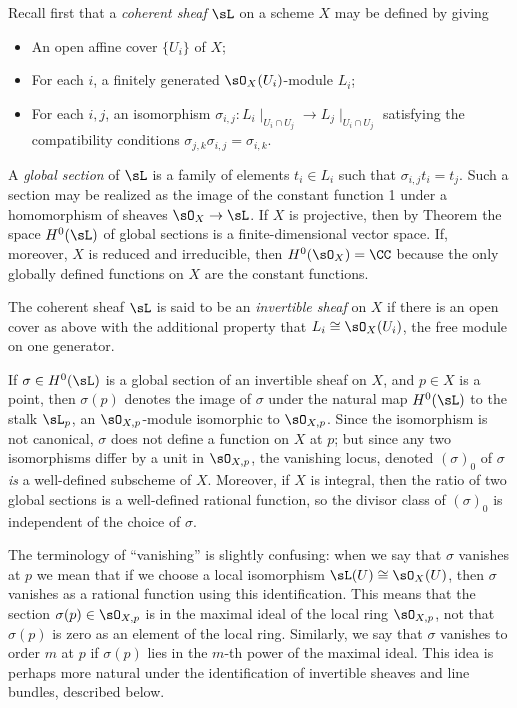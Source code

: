 Recall first that a \emph{coherent sheaf} $\sL$ on a scheme $X$ may be defined by
giving 
\begin{itemize}
 \item An open affine cover $\{U_{i}\}$ of $X$; 
 \item For each $i$, a finitely generated $\sO_{X}(U_{i})$-module $L_{i}$;
 \item For each $i,j$, an isomorphism $\sigma_{i,j}: L_{i}\mid_{U_{i}\cap U_{j}} \to L_{j}\mid_{U_{i}\cap U_{j}}$
 satisfying the compatibility conditions $\sigma_{j,k}\sigma_{i,j} = \sigma_{i,k}$. 
 \end{itemize}

A \emph{global section} of $\sL$ is a family of elements $t_{i}\in L_{i}$ such that 
$\sigma_{i,j} t_{i} = t_{j}$. Such a section may be realized as the image of the constant function 1 under
a homomorphism of sheaves $\sO_{X} \to \sL$. If $X$ is projective, then 
by Theorem \cite[Thm III.5.2]{H} the space $H^{0}(\sL)$  of global sections is
a finite-dimensional vector space. If, moreover, $X$ is reduced and irreducible, then $H^{0}(\sO_{X}) = \CC$ because the only globally defined
functions on $X$ are the constant functions.

The coherent sheaf $\sL$ is said to be an \emph{invertible sheaf} on $X$ if there is an open cover as above with the additional property
that $L_{i} \cong \sO_X(U_{i})$, the free module on one generator. 

If $\sigma \in H^0(\sL)$ is a global section of an invertible sheaf
on $X$, and $p\in X$ is a point, then $\sigma(p)$ denotes the image of $\sigma$ under the natural map $H^0(\sL)$ to the stalk $\sL_{p}$, an $\sO_{X,p}$-module isomorphic to $\sO_{X,p}$. Since the isomorphism is not canonical, $\sigma$ does not define a function on $X$ at $p$; but since any two isomorphisms
differ by a unit in $\sO_{X,p}$, the vanishing locus, denoted $(\sigma)_0$ of $\sigma$ \emph{is} a well-defined subscheme of $X$. Moreover, if $X$ is integral, then the ratio of two global sections is a well-defined rational function, so the divisor class of 
$(\sigma)_0$ is independent of the choice of $\sigma$.

The terminology of ``vanishing'' is slightly confusing: when we  say that $\sigma$ vanishes at $p$ we mean
that if we choose a local isomorphism $\sL(U) \cong \sO_X(U)$, then $\sigma$ vanishes as a rational function using this
identification. This means that the section $\sigma(p)\in \sO_{X,p}$ is in the maximal ideal of the local ring $ \sO_{X,p}$, not that $\sigma(p)$ is zero
as an element of the local ring. Similarly, we say that $\sigma$ vanishes to order $m$ at $p$ if $\sigma(p)$ lies in the
$m$-th power of the maximal ideal. This idea is perhaps more natural under the identification of invertible sheaves and line bundles, described below.

